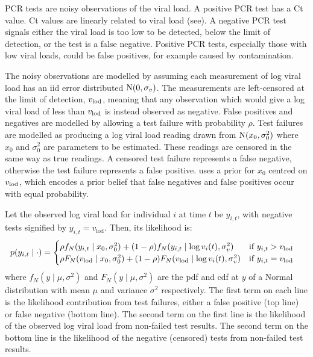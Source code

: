 \documentclass[thesis.tex]{subfiles}
\begin{document}
PCR tests are noisy observations of the viral load.
A positive PCR test has a Ct value.
Ct values are linearly related to viral load (see).
A negative PCR test signals either the viral load is too low to be detected, \ie below the limit of detection, or the test is a false negative.
Positive PCR tests, especially those with low viral loads, could be false positives, for example caused by contamination.

The noisy observations are modelled by assuming each measurement of log viral load has an iid error distributed $\operatorname{N}(0, \sigma_v)$.
The measurements are left-censored at the limit of detection, $v_\text{lod}$, meaning that any observation which would give a log viral load of less than $v_\text{lod}$ is instead observed as negative.
False positives and negatives are modelled by allowing a test failure with probability $\rho$.
Test failures are modelled as producing a log viral load reading drawn from $\operatorname{N}(x_0, \sigma_0^2)$ where $x_0$ and $\sigma_0^2$ are parameters to be estimated.
These readings are censored in the same way as true readings.
A censored test failure represents a false negative, otherwise the test failure represents a false positive.
\textcite{hakkiOnset} uses a prior for $x_0$ centred on $v_\text{lod}$, which encodes a prior belief that false negatives and false positives occur with equal probability.

Let the observed log viral load for individual $i$ at time $t$ be $y_{i,t}$, with negative tests signified by $y_{i,t}=v_\text{lod}$.
Then, its likelihood is:
\begin{align}
p(y_{i,t} \mid \cdot) &= \begin{cases}
    \rho f_N(y_{i,t} \mid x_0, \sigma_0^2) + (1 - \rho) f_N(y_{i,t} \mid \log v_i(t), \sigma_v^2) & \text{if $y_{i,t} > v_\text{lod}$}\\
    \rho F_N(v_\text{lod} \mid x_0, \sigma_0^2) + (1 - \rho) F_N(v_\text{lod} \mid \log v_i(t), \sigma_v^2) & \text{if $y_{i,t} = v_\text{lod}$} \label{ATACCC:eq:hakki-likelihood}
\end{cases}
\end{align}
where $f_N(y \mid \mu, \sigma^2)$ and $F_N(y \mid \mu, \sigma^2)$ are the pdf and cdf at $y$ of a Normal distribution with mean $\mu$ and variance $\sigma^2$ respectively.
The first term on each line is the likelihood contribution from test failures, either a false positive (top line) or false negative (bottom line).
The second term on the first line is the likelihood of the observed log viral load from non-failed test results.
The second term on the bottom line is the likelihood of the negative (censored) tests from non-failed test results.
\end{document}
